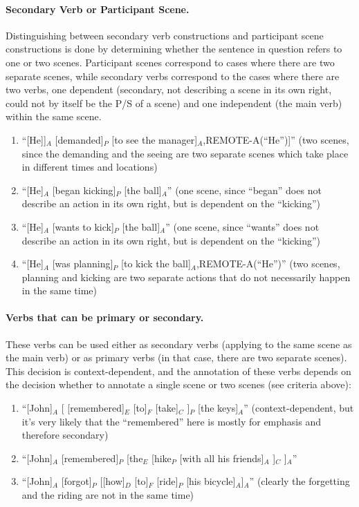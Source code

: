 \documentclass[11pt]{article}
\newcommand{\be}{\begin{enumerate}}
\newcommand{\ee}{\end{enumerate}}
\begin{document}
\paragraph{
Secondary Verb or Participant Scene.} Distinguishing between secondary verb constructions and participant scene constructions is done by determining whether the sentence in question refers to one or two scenes. Participant scenes correspond to cases where there are two separate scenes, while secondary verbs correspond to the cases where there are two verbs, one dependent (secondary, not describing a scene in its own right, could not by itself be the P/S of a scene) and one independent (the main verb) within the same scene.
\be
\item
``[He]]$_A$ [demanded]$_P$ [to see the manager]$_A$,REMOTE-A(``He'')]'' (two scenes, since the demanding and the seeing are two separate scenes which take place in different times and locations)
\item
``[He]$_A$ [began kicking]$_P$ [the ball]$_A$'' (one scene, since ``began'' does not describe an action in its own right, but is dependent on the ``kicking'')
\item
``[He]$_A$ [wants to kick]$_P$ [the ball]$_A$'' (one scene, since ``wants'' does not describe an action in its own right, but is dependent on the ``kicking'')
\item
``[He]$_A$ [was planning]$_P$ [to kick the ball]$_A$,REMOTE-A(``He'')'' (two scenes,  planning and kicking are two separate actions that do not necessarily happen in the same time)
\ee

\paragraph{
Verbs that can be primary or secondary.} These verbs can be used either as secondary verbs (applying to the same scene as the main verb) or as primary verbs (in that case, there are two separate scenes). This decision is context-dependent, and the annotation of these verbs depends on the decision whether to annotate a single scene or two scenes (see criteria above):
\be
\item
``[John]$_A$ [ [remembered]$_E$ [to]$_F$ [take]$_C$ ]$_P$ [the keys]$_A$'' (context-dependent, but it's very likely that the ``remembered'' here is mostly for emphasis and therefore secondary)
\item
``[John]$_A$ [remembered]$_P$ [the$_E$ [hike$_P$ [with all his friends]$_A$ ]$_C$ ]$_A$''
\item
``[John]$_A$ [forgot]$_P$ [[how]$_D$ [to]$_F$ [ride]$_P$ [his bicycle]$_A$]$_A$'' (clearly the forgetting and the riding are not in the same time)
\ee
\end{document}
